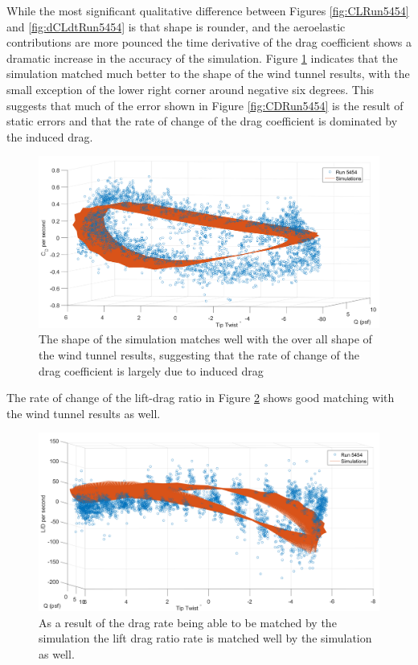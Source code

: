 \documentclass[11pt]{ucthesis}
\begin{document}
While the most significant qualitative difference between Figures \ref{fig:CLRun5454} and \ref{fig:dCLdtRun5454} is that shape is rounder, and the aeroelastic contributions are more pounced the time derivative of the drag coefficient shows a dramatic increase in the accuracy of the simulation. Figure \ref{fig:dCDdtRun5454} indicates that the simulation matched much better to the shape of the wind tunnel results, with the small exception of the lower right corner around negative six degrees. This suggests that much of the error shown in Figure \ref{fig:CDRun5454} is the result of static errors and that the rate of change of the drag coefficient is dominated by the induced drag.

\begin{figure}[thpb]
\centering
\includegraphics[width=.75\linewidth]{Figures/diffCD5454.png}
\caption{The shape of the simulation matches well with the over all shape of the wind tunnel results, suggesting that the rate of change of the drag coefficient is largely due to induced drag}
\label{fig:dCDdtRun5454}
\end{figure}

The rate of change of the lift-drag ratio in Figure \ref{fig:dLDdtRun5454} shows good matching with the wind tunnel results as well. 

\begin{figure}[thpb]
\centering
\includegraphics[width=.75\linewidth]{Figures/diffLD5454.png}
\caption{As a result of the drag rate being able to be matched by the simulation the lift drag ratio rate is matched well by the simulation as well.}
\label{fig:dLDdtRun5454}
\end{figure}
\end{document}
